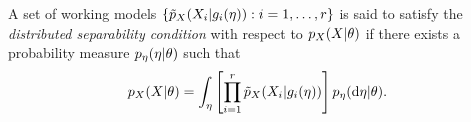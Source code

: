 \begin{definition}
A set of working models $\{\tilde{p}_X(X_i |g_{i}(\eta)): i=1,\ldots, r\}$ is said to satisfy the \emph{distributed separability condition} with respect to $p_X(X | \theta)$ if there exists a probability measure $p_\eta( \eta | \theta)$ such that
\begin{equation}
 \psci(X | \param) = \int_\eta\left[ \prod_{i=1}^r \pwork(X_i | g_i(\workparam)) \right] p_\workparam(\dd\workparam | \param).\  \label{multiphase:eq:dsc}
\end{equation}
\end{definition}



